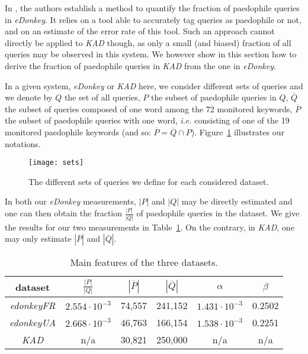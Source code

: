 \documentclass[a4paper,oneside,12pt]{article}
\newcommand{\edonkey}{{\em eDonkey}\xspace}
\newcommand{\edonkeydsfr}{{\em edonkeyFR}\xspace}
\newcommand{\edonkeydsua}{{\em edonkeyUA}\xspace}
\newcommand{\ie}{{\em i.e.}\xspace}
\newcommand{\kad}{{\em KAD}\xspace}
\newcommand{\ipm}{\cite{QuantifyingIPM}\xspace}
\begin{document}
In \ipm, the authors establish a method to quantify the fraction of paedophile queries in \edonkey. It relies on a tool able to accurately tag queries as paedophile or not, and on an estimate of the error rate of this tool. Such an approach cannot directly be applied to \kad though, as only a small (and biased) fraction of all queries may be observed in this system. We however show in this section how to derive the fraction of paedophile queries in \kad from the one in \edonkey.

In a given system, \edonkey or \kad here, we consider different sets of queries and we denote by $Q$ the set of all queries, $P$ the subset of paedophile queries in $Q$, $\overline{Q}$ the subset of queries composed of one word among the 72 monitored keywords, $\overline{P}$ the subset of paedophile queries with one word, \ie consisting of one of the 19 monitored paedophile keywords (and so: $\overline{P}=\overline{Q}\cap P$). Figure~\ref{fig-sets} illustrates our notations.

\begin{figure}[!h]
\centering
\texttt{[image: sets]}
\caption{
 The different sets of queries we define for each considered dataset.
}
\label{fig-sets}
\end{figure}

In both our \edonkey measurements, $|P|$ and $|Q|$ may be directly estimated \ipm and one can then obtain the fraction $\frac{|P|}{|Q|}$ of paedophile queries in the dataset. We give the results for our two measurements in Table~\ref{table-inference}. On the contrary, in \kad, one may only estimate $|\overline{P}|$ and $|\overline{Q}|$. 

\begin{table}[!ht]
\centering
\begin{tabular}{|c|c|c|c|c|c|}
\hline
\rule[-1.55ex]{0cm}{4.5ex} dataset & $\frac{|P|}{|Q|}$ & $|\overline{P}|$ & $|\overline{Q}|$ & $\alpha$ & $\beta$ \\
\hline
\edonkeydsfr & $2.554 \cdot 10^{-3}$ & 74,557 & 241,152 & $1.431 \cdot 10^{-3}$ & 0.2502  \\
\hline
\edonkeydsua & $2.668 \cdot 10^{-3}$ & 46,763 & 166,154 & $1.538 \cdot 10^{-3}$  & 0.2251 \\ 
\hline
\kad & n/a & 30,821 & 250,000 & \mbox{n/a} & \mbox{n/a} \\
\hline
\end{tabular}
\caption{Main features of the three datasets.}
\label{table-inference}
\end{table}
\end{document}
